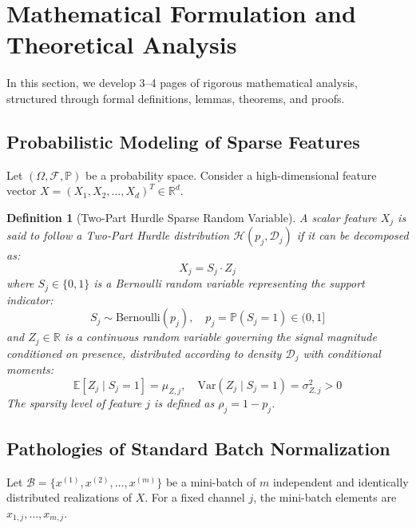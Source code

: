 \documentclass[twocolumn,10pt]{article}
\newtheorem{definition}{Definition}
\begin{document}
\section{Mathematical Formulation and Theoretical Analysis}
\label{sec:theory}

In this section, we develop 3--4 pages of rigorous mathematical analysis, structured through formal definitions, lemmas, theorems, and proofs.

\subsection{Probabilistic Modeling of Sparse Features}

Let $(\Omega, \mathcal{F}, \mathbb{P})$ be a probability space. Consider a high-dimensional feature vector $X = (X_1, X_2, \dots, X_d)^T \in \mathbb{R}^d$.

\begin{definition}[Two-Part Hurdle Sparse Random Variable]
A scalar feature $X_j$ is said to follow a Two-Part Hurdle distribution $\mathcal{H}(p_j, \mathcal{D}_j)$ if it can be decomposed as:
\begin{equation}
X_j = S_j \cdot Z_j
\end{equation}
where $S_j \in \{0, 1\}$ is a Bernoulli random variable representing the support indicator:
\begin{equation}
S_j \sim \text{Bernoulli}(p_j), \quad p_j = \mathbb{P}(S_j = 1) \in (0, 1]
\end{equation}
and $Z_j \in \mathbb{R}$ is a continuous random variable governing the signal magnitude conditioned on presence, distributed according to density $\mathcal{D}_j$ with conditional moments:
\begin{equation}
\mathbb{E}[Z_j \mid S_j = 1] = \mu_{Z,j}, \quad \mathrm{Var}(Z_j \mid S_j = 1) = \sigma_{Z,j}^2 > 0
\end{equation}
The sparsity level of feature $j$ is defined as $\rho_j = 1 - p_j$.
\end{definition}

\subsection{Pathologies of Standard Batch Normalization}

Let $\mathcal{B} = \{x^{(1)}, x^{(2)}, \dots, x^{(m)}\}$ be a mini-batch of $m$ independent and identically distributed realizations of $X$. For a fixed channel $j$, the mini-batch elements are $x_{1,j}, \dots, x_{m,j}$.
\end{document}

